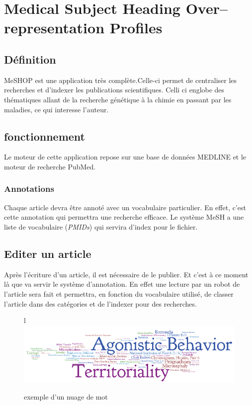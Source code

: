 \section{Medical Subject Heading Over–representation Profiles}
\subsection{Définition}
MeSHOP est une application très complète.Celle-ci permet de centraliser les recherches et d'indexer les publications scientifiques. Celli ci englobe des thématiques allant de la recherche génétique à la chimie en passant par les maladies, ce qui interesse l'auteur.

\subsection{fonctionnement}
Le moteur de cette application repose sur une base de données MEDLINE et le moteur de recherche PubMed.

\subsubsection{Annotations}
Chaque article devra être annoté avec un vocabulaire particulier. En effet, c'est cette annotation qui permettra une recherche efficace. Le système MeSH a une liste de vocabulaire (\textit{PMIDs}) qui servira d'index pour le fichier.

\subsection{Editer un article}
Après l'écriture d'un article, il est nécessaire de le publier. Et c'est à ce moment là que va servir le système d'annotation. En effet une lecture par un robot de l'article sera fait et permettra, en fonction du vocabulaire utilisé, de classer l'article dans des catégories et de l'indexer pour des recherches.
\\
\begin{figure}{l}{}
\centering
\includegraphics{nuagepoint}
\caption{exemple d'un nuage de mot}
\end{figure}


